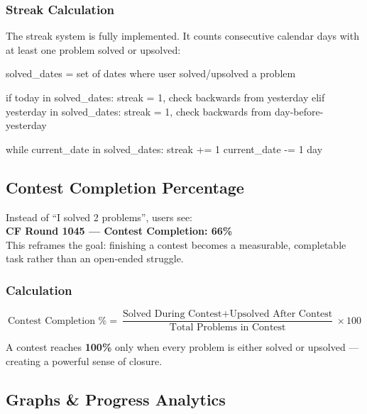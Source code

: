 \documentclass[11pt, a4paper]{article}
\begin{document}
\subsubsection{Streak Calculation}

The streak system is fully implemented. It counts consecutive calendar days
with at least one problem solved or upsolved:

\begin{codebox}
solved_dates = set of dates where user solved/upsolved a problem

if today in solved_dates:
    streak = 1, check backwards from yesterday
elif yesterday in solved_dates:
    streak = 1, check backwards from day-before-yesterday

while current_date in solved_dates:
    streak += 1
    current_date -= 1 day
\end{codebox}

\subsection{Contest Completion Percentage}

\begin{orangebox}
  Instead of ``I solved 2 problems'', users see:\\[0.5em]
  \hspace*{2em}\textbf{CF Round 1045 --- Contest Completion: 66\%}\\[0.5em]
  This reframes the goal: finishing a contest becomes a measurable,
  completable task rather than an open-ended struggle.
\end{orangebox}

\subsubsection{Calculation}

\[
  \text{Contest Completion \%} =
  \frac{\text{Solved During Contest} + \text{Upsolved After Contest}}
       {\text{Total Problems in Contest}} \times 100
\]

A contest reaches \textbf{100\%} only when every problem is either solved
or upsolved --- creating a powerful sense of closure.

\subsection{Graphs \& Progress Analytics}
\end{document}
